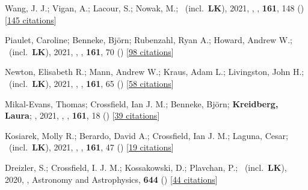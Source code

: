 \item[{\color{numcolor}\scriptsize51}] Wang, J. J.; Vigan, A.; Lacour, S.; Nowak, M.; \etal\ (incl.\ \textbf{LK}), 2021, , \aj, \textbf{161}, 148 () [\href{https://ui.adsabs.harvard.edu/abs/2021AJ....161..148W}{145 citations}]

\item[{\color{numcolor}\scriptsize50}] Piaulet, Caroline; Benneke, Bj{\"o}rn; Rubenzahl, Ryan A.; Howard, Andrew W.; \etal\ (incl.\ \textbf{LK}), 2021, , \aj, \textbf{161}, 70 () [\href{https://ui.adsabs.harvard.edu/abs/2021AJ....161...70P}{98 citations}]

\item[{\color{numcolor}\scriptsize49}] Newton, Elisabeth R.; Mann, Andrew W.; Kraus, Adam L.; Livingston, John H.; \etal\ (incl.\ \textbf{LK}), 2021, , \aj, \textbf{161}, 65 () [\href{https://ui.adsabs.harvard.edu/abs/2021AJ....161...65N}{58 citations}]

\item[{\color{numcolor}\scriptsize48}] Mikal-Evans, Thomas; Crossfield, Ian J. M.; Benneke, Bj{\"o}rn; \textbf{Kreidberg, Laura}; \etal, 2021, , \aj, \textbf{161}, 18 () [\href{https://ui.adsabs.harvard.edu/abs/2021AJ....161...18M}{39 citations}]

\item[{\color{numcolor}\scriptsize47}] Kosiarek, Molly R.; Berardo, David A.; Crossfield, Ian J. M.; Laguna, Cesar; \etal\ (incl.\ \textbf{LK}), 2021, , \aj, \textbf{161}, 47 () [\href{https://ui.adsabs.harvard.edu/abs/2021AJ....161...47K}{19 citations}]

\item[{\color{numcolor}\scriptsize46}] Dreizler, S.; Crossfield, I. J. M.; Kossakowski, D.; Plavchan, P.; \etal\ (incl.\ \textbf{LK}), 2020, , Astronomy and Astrophysics, \textbf{644} () [\href{https://ui.adsabs.harvard.edu/abs/2020A&A...644A.127D}{44 citations}]

